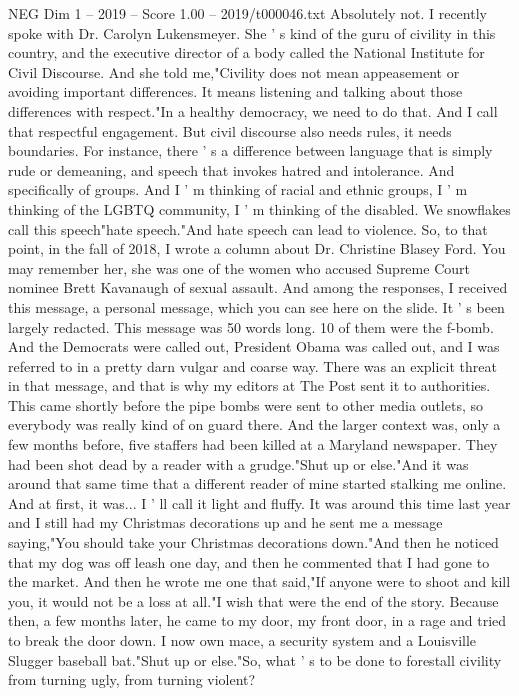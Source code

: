 \begin{textsample}{NEG Dim 1 – 2019 – Score 1.00 – 2019/t000046.txt}
Absolutely not.
I recently spoke with Dr.
Carolyn Lukensmeyer.
She ' s kind of the guru of civility in this country, and the executive director of a body called the National Institute for Civil Discourse.
And she told me,"Civility does not mean appeasement or avoiding important differences.
It means listening and talking about those differences with respect."In a healthy democracy, we need to do that.
And I call that respectful engagement.
But civil discourse also needs rules, it needs boundaries.
For instance, there ' s a difference between language that is simply rude or demeaning, and speech that invokes hatred and intolerance.
And specifically of groups.
And I ' m thinking of racial and ethnic groups, I ' m thinking of the LGBTQ community, I ' m thinking of the disabled.
We snowflakes call this speech"hate speech."And hate speech can lead to violence.
So, to that point, in the fall of 2018, I wrote a column about Dr.
Christine Blasey Ford.
You may remember her, she was one of the women who accused Supreme Court nominee Brett Kavanaugh of sexual assault.
And among the responses, I received this message, a personal message, which you can see here on the slide.
It ' s been largely redacted.
This message was 50 words long. 10 of them were the f-bomb.
And the Democrats were called out, President Obama was called out, and I was referred to in a pretty darn vulgar and coarse way.
There was an explicit threat in that message, and that is why my editors at The Post sent it to authorities.
This came shortly before the pipe bombs were sent to other media outlets, so everybody was really kind of on guard there.
And the larger context was, only a few months before, five staffers had been killed at a Maryland newspaper.
They had been shot dead by a reader with a grudge."Shut up or else."And it was around that same time that a different reader of mine started stalking me online.
And at first, it was...
I ' ll call it light and fluffy.
It was around this time last year and I still had my Christmas decorations up and he sent me a message saying,"You should take your Christmas decorations down."And then he noticed that my dog was off leash one day, and then he commented that I had gone to the market.
And then he wrote me one that said,"If anyone were to shoot and kill you, it would not be a loss at all."I wish that were the end of the story.
Because then, a few months later, he came to my door, my front door, in a rage and tried to break the door down.
I now own mace, a security system and a Louisville Slugger baseball bat."Shut up or else."So, what ' s to be done to forestall civility from turning ugly, from turning violent?

\end{textsample}
